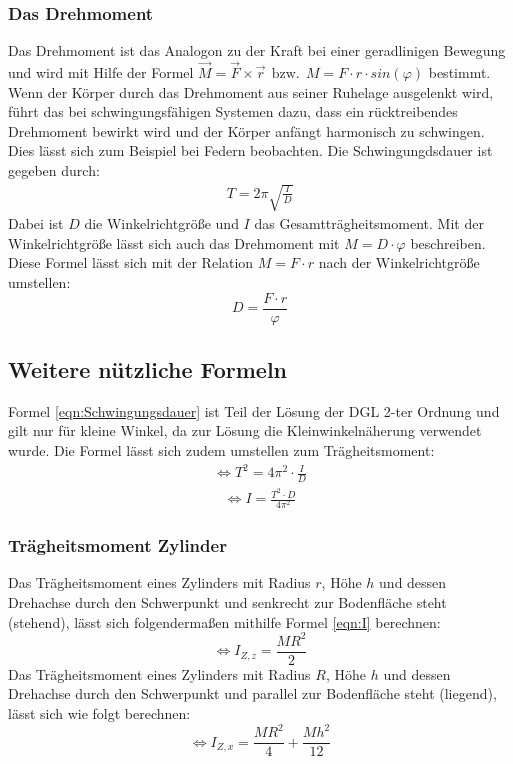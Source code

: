 \subsubsection{Das Drehmoment}

Das Drehmoment ist das Analogon zu der Kraft bei einer geradlinigen Bewegung und wird mit Hilfe der Formel $\vec{M} = \vec{F} \times \vec{r} \:\: \mathrm{bzw.} \:\: M = F \cdot r \cdot sin(\varphi)$
bestimmt.
Wenn der Körper durch das Drehmoment aus seiner Ruhelage ausgelenkt wird, führt das bei schwingungsfähigen Systemen dazu,
dass ein rücktreibendes Drehmoment bewirkt wird und der Körper anfängt harmonisch zu schwingen. Dies lässt sich zum Beispiel bei Federn beobachten. Die Schwingungdsdauer
ist gegeben durch:
\begin{align}
    \label{eqn:Schwingungsdauer}
    T = 2\pi \sqrt{\frac{I}{D}}
\end{align}
Dabei ist $D$ die Winkelrichtgröße und $I$ das Gesamtträgheitsmoment. Mit der Winkelrichtgröße lässt sich auch das Drehmoment mit $M = D \cdot \varphi$ beschreiben.
\\
Diese Formel lässt sich mit der Relation $M = F \cdot r$ nach der Winkelrichtgröße umstellen:
\begin{equation}
    D = \frac{F\cdot r}{\varphi} \label{eqn:Winkelrichtgroesse}
\end{equation}

\subsection{Weitere nützliche Formeln}

Formel \ref{eqn:Schwingungsdauer} ist Teil der Lösung der DGL 2-ter Ordnung und gilt nur für kleine
 Winkel, da zur Lösung die Kleinwinkelnäherung verwendet wurde.
Die Formel lässt sich zudem umstellen zum Trägheitsmoment:
\begin{align}
    \label{eqn:T}
    \Leftrightarrow T^2 = 4\pi^2 \cdot \frac{I}{D} 
\end{align}
\begin{align}
    \label{eqn:I(T)}
    \Leftrightarrow I = \frac{T^2 \cdot D}{4\pi^2}
\end{align}

\subsubsection{Trägheitsmoment Zylinder}

Das Trägheitsmoment eines Zylinders mit Radius $r$, Höhe $h$ und dessen Drehachse durch den Schwerpunkt und senkrecht zur Bodenfläche steht (stehend),
lässt sich folgendermaßen mithilfe Formel \ref{eqn:I} berechnen:
\begin{equation}
    \label{eqn:Izz}
    \Leftrightarrow I_{Z,z} = \frac{MR^2}{2}
\end{equation}
Das Trägheitsmoment eines Zylinders mit Radius $R$, Höhe $h$ und dessen Drehachse durch den Schwerpunkt und parallel zur Bodenfläche steht (liegend),
lässt sich wie folgt berechnen:
\begin{equation}
    \label{eqn:Izx}
    \Leftrightarrow I_{Z,x} = \frac{MR^2}{4} + \frac{Mh^2}{12}
\end{equation}
 
